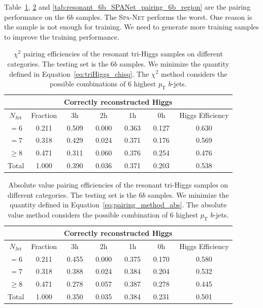 \documentclass[12pt]{article}
\begin{document}
    Table~\ref{tab:resonant_chi2_pairing_6b_region}, \ref{tab:resonant_abs_pairing_6b_region} and \ref{tab:resonant_6b_SPANet_pairing_6b_region} are the pairing performance on the $6b$ samples. The \textsc{Spa-Net} performs the worst. One reason is the sample is not enough for training. We need to generate more training samples to improve the training performance.
    \begin{table}[htpb]
		\centering
        \caption{$\chi^2$ pairing efficiencies of the resonant tri-Higgs samples on different categories. The testing set is the $6b$ samples. We minimize the quantity defined in Equation~\ref{eq:triHiggs_chisq}. The $\chi^2$ method considers the possible combinations of 6 highest $p_{\text{T}}$ $b$-jets.}
		\label{tab:resonant_chi2_pairing_6b_region}
		\begin{tabular}{c|c|cccc|c}
        \multicolumn{1}{l|}{} &          & \multicolumn{4}{c|}{Correctly reconstructed Higgs} & \multicolumn{1}{l}{} \\ \hline
        $N_\text{Jet}$        & Fraction & 3h          & 2h         & 1h         & 0h         & Higgs Efficiency     \\ \hline
        $=6$                  & 0.211 & 0.509 & 0.000 & 0.363 & 0.127 & 0.630                \\
        $=7$                  & 0.318 & 0.429 & 0.024 & 0.371 & 0.176 & 0.569                \\
        $\ge 8$               & 0.471 & 0.311 & 0.060 & 0.376 & 0.254 & 0.476                \\ \hline
        Total                 & 1.000 & 0.390 & 0.036 & 0.371 & 0.203 & 0.538               
		\end{tabular}
    \end{table}
    \begin{table}[htpb]
		\centering
		\caption{Absolute value pairing efficiencies of the resonant tri-Higgs samples on different categories. The testing set is the $6b$ samples. We minimize the quantity defined in Equation~\ref{eq:pairing_method_abs}. The absolute value method considers the possible combination of 6 highest $p_{\text{T}}$ $b$-jets.}
		\label{tab:resonant_abs_pairing_6b_region}
        \begin{tabular}{c|c|cccc|c}
            \multicolumn{1}{l|}{} &          & \multicolumn{4}{c|}{Correctly reconstructed Higgs} & \multicolumn{1}{l}{} \\ \hline
            $N_{\text{Jet}}$    & Fraction & 3h          & 2h         & 1h         & 0h         & Higgs Efficiency     \\ \hline
            $=6$                  & 0.211 & 0.455 & 0.000 & 0.375 & 0.170 & 0.580 \\
            $=7$                  & 0.318 & 0.388 & 0.024 & 0.384 & 0.204 & 0.532 \\
            $\ge 8$               & 0.471 & 0.278 & 0.057 & 0.387 & 0.278 & 0.445 \\ \hline
            Total                 & 1.000 & 0.350 & 0.035 & 0.384 & 0.231 & 0.501 
		\end{tabular}
	\end{table}
\end{document}
